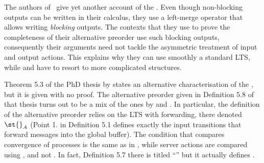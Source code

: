 



The authors of~\cite{DBLP:journals/tcs/NicolaP00} give yet another account of the \mustpreorder.
Even though non-blocking outputs can be written in their calculus,
they use a left-merge operator that allows writing {\em blocking} outputs.
The contexts that they use to prove the completeness of their
alternative preorder use such blocking outputs, consequently
their arguments need not tackle the asymmetric treatment of input and
output actions. This explains why they can use smoothly a standard
LTS, while \cite{DBLP:conf/fsttcs/CastellaniH98} and
\cite{DBLP:journals/iandc/BorealeNP02} have to resort to more
complicated structures.


Theorem 5.3 of the PhD thesis by \cite{DBLP:phd/us/Thati03} states an
alternative characterisation of the \mustpreorder, but it is given
with no proof.  The alternative preorder given in Definition 5.8 of
that thesis turns out to be a mix of the ones by
\cite{DBLP:conf/fsttcs/CastellaniH98} and
\cite{DBLP:journals/iandc/BorealeNP02}.  In particular, the
definition of the alternative preorder relies on the LTS with
forwarding, there denoted~$\st{}_A$ (Point 1. in Definition 5.1
defines exactly the input transitions that forward messages into the
global buffer).  The condition that compares convergence of processes
is the same as in \cite{DBLP:conf/fsttcs/CastellaniH98}, while
server actions are compared using \MustSets, and not \AcceptanceSets.
In fact, Definition 5.7 there is titled ``\AcceptanceSets'' but it
actually defines \MustSets.




